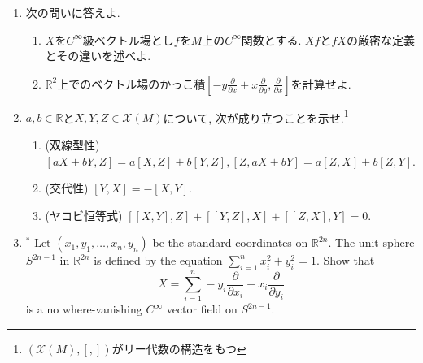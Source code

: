 \documentclass[dvipdfmx,a4paper,11pt]{article}
\newcommand{\R}{\mathbb{R}}
\theoremstyle{definition}
\newcommand{\pdrv}[2]{\frac{\partial #1}{\partial #2}}
\begin{document}
\vspace{11pt}
\hspace{-22pt}{\large $\bullet$ベクトル場の問題}
\begin{enumerate}[label=\textbf{問}2.\arabic*]

\item 次の問いに答えよ.
\begin{enumerate}
\item $X$を$C^{\infty}$級ベクトル場とし$f$を$M$上の$C^{\infty}$関数とする. $Xf$と$fX$の厳密な定義とその違いを述べよ.
\item $\R^{2}$上でのベクトル場のかっこ積$[- y \pdrv{}{x} + x \pdrv{}{y}, \pdrv{}{x}]$を計算せよ.
\end{enumerate}



\item 
$a,b \in \R$と$X,Y,Z \in \mathscr{X}(M)$について, 次が成り立つことを示せ.\footnote{$(\mathscr{X}(M), [ , ])$がリー代数の構造をもつ}
\begin{enumerate}
\item (双線型性) $[aX+bY, Z]=a[X,Z] + b[Y,Z], [Z, aX+bY]=a[Z,X] + b[Z,Y] $.
\item (交代性) $ [Y,X]=-[X,Y]$.
\item (ヤコビ恒等式) $[[X,Y],Z] + [[Y,Z],X] +[[Z,X],Y] = 0$.
\end{enumerate}




\item \label{sn_no_vanishing} $^{*}$ Let $(x_1, y_1, \ldots, x_{n}, y_{n})$ be the standard coordinates on $\R^{2n}$. The unit sphere $S^{2n-1}$ in $\R^{2n}$ is defined by the equation $\sum_{i=1}^{n}x_{i}^{2} + y_{i}^{2} =1$.
Show that
$$
X = \sum_{i=1}^{n} - y_i \pdrv{}{x_i} + x_i \pdrv{}{y_i}
$$ 
is a no where-vanishing $C^{\infty}$ vector field on $S^{2n-1}$.






\end{enumerate}
\end{document}
